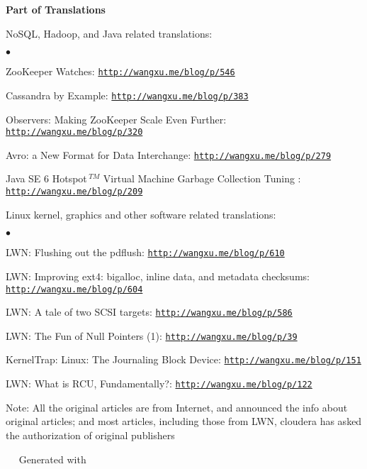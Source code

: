 \documentclass[a4paper,margin,line]{res}
\newenvironment{list1}{
  \begin{list}{\ding{113}}{%
      \setlength{\itemsep}{0in}
      \setlength{\parsep}{0in} \setlength{\parskip}{0in}
      \setlength{\topsep}{0in} \setlength{\partopsep}{0in} 
      \setlength{\leftmargin}{0.17in}}}{\end{list}}
\newenvironment{list2}{
  \begin{list}{$\bullet$}{%
      \setlength{\itemsep}{0in}
      \setlength{\parsep}{0in} \setlength{\parskip}{0in}
      \setlength{\topsep}{0in} \setlength{\partopsep}{0in} 
      \setlength{\leftmargin}{0.2in}}}{\end{list}}
\newcommand{\http}{http:/\hspace{-0.3ex}/}
\newcommand{\hindent}{\mbox{\hspace{8ex}}}
\begin{document}
\begin{resume}
\textbf{Part of Translations}\\
\vspace*{-.1in}
\begin{list1}
\item[] NoSQL, Hadoop, and Java related translations:
\begin{list2}
\vspace*{.05in}
\item ZooKeeper Watches: \href{http://wangxu.me/blog/p/546}{\tt\http{}wangxu.me/blog/p/546}
\item Cassandra by Example: \href{http://wangxu.me/blog/p/383}{\tt\http{}wangxu.me/blog/p/383}
\item Observers: Making ZooKeeper Scale Even Further: \href{http://wangxu.me/blog/p/320}{\tt\http{}wangxu.me/blog/p/320}
\item Avro: a New Format for Data Interchange: \href{http://wangxu.me/blog/p/279}{\tt\http{}wangxu.me/blog/p/279}
\item Java SE 6 Hotspot${\,}^{TM}$ Virtual Machine Garbage Collection Tuning : \\
    \hindent\href{http://wangxu.me/blog/p/209}{\tt\http{}wangxu.me/blog/p/209}
\vspace*{.05in}
\end{list2}
\item[] Linux kernel, graphics and other software related translations:
\begin{list2}
\vspace*{.05in}
\item LWN: Flushing out the pdflush: \href{http://wangxu.me/blog/p/610}{\tt\http{}wangxu.me/blog/p/610}
\item LWN: Improving ext4: bigalloc, inline data, and metadata checksums: \\ \hindent \href{http://wangxu.me/blog/p/604}{\tt\http{}wangxu.me/blog/p/604}
\item LWN: A tale of two SCSI targets: \href{http://wangxu.me/blog/p/586}{\tt \http{}wangxu.me/blog/p/586}
\item LWN: The Fun of Null Pointers (1): \href{http://wangxu.me/blog/p/39}{\tt\http{}wangxu.me/blog/p/39}
\item KernelTrap: Linux: The Journaling Block Device: \href{http://wangxu.me/blog/p/151}{\tt\http{}wangxu.me/blog/p/151}
\item LWN: What is RCU, Fundamentally?: \enskip\href{http://wangxu.me/blog/p/122}{\tt\http{}wangxu.me/blog/p/122}
\end{list2}
\end{list1}
{\small \textsf{Note: All the original articles are from Internet, and announced the info about original articles; and most articles, including those from LWN, cloudera has asked the authorization of original publishers}}

\end{resume}

\vfill
\vfill
\mbox{ }\hspace{100pt}	\small\Resume\ Generated with 
\end{document}
